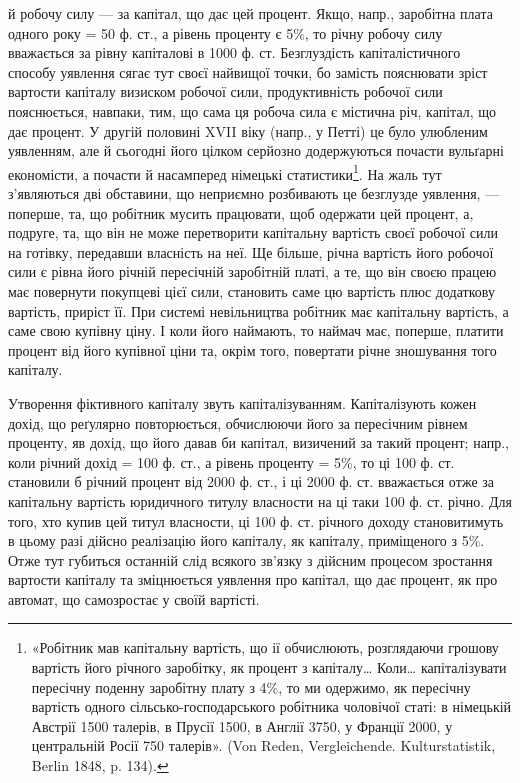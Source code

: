 \parcont{}  %
й робочу силу — за капітал, що дає цей процент. Якщо, напр., заробітна плата
одного року = 50 ф. ст., а рівень проценту є 5\%, то річну робочу силу вважається
за рівну капіталові в 1000 ф. ст. Безглуздість капіталістичного способу
уявлення сягає тут своєї найвищої точки, бо замість пояснювати зріст вартости
капіталу визиском робочої сили, продуктивність робочої сили пояснюється, навпаки,
тим, що сама ця робоча сила є містична річ, капітал, що дає процент.
У другій половині XVII віку (напр., у Петті) це було улюбленим уявленням,
але й сьогодні його цілком серйозно додержуються почасти вульґарні економісти,
а почасти й насамперед німецькі статистики\footnote{
«Робітник мав капітальну вартість, що ії обчислюють, розглядаючи грошову вартість його
річного заробітку, як процент з капіталу\dots{} Коли\dots{} капіталізувати пересічну поденну заробітну
плату з 4\%, то ми одержимо, як пересічну вартість одного сільсько-господарського робітника чоловічої
статі: в німецькій Австрії 1500 талерів, в Прусії 1500, в Англії 3750, у Франції 2000, у
центральній Росії 750 талерів». (Von Reden, Vergleichende. Kulturstatistik, Berlin 1848, p. 134).
}. На жаль тут з’являються дві
обставини, що неприємно розбивають це безглузде уявлення, — поперше, та, що
робітник мусить працювати, щоб одержати цей процент, а, подруге, та, що він
не може перетворити капітальну вартість своєї робочої сили на готівку, передавши
власність на неї. Ще більше, річна вартість його робочої сили є рівна
його річній пересічній заробітній платі, а те, що він своєю працею має повернути
покупцеві цієї сили, становить саме цю вартість плюс додаткову вартість,
приріст її. При системі невільництва робітник має капітальну вартість, а саме
свою купівну ціну. І коли його наймають, то наймач має, поперше, платити
процент від його купівної ціни та, окрім того, повертати річне зношування
того капіталу.

Утворення фіктивного капіталу звуть капіталізуванням. Капіталізують кожен
дохід, що реґулярно повторюється, обчислюючи його за пересічним рівнем проценту,
яв дохід, що його давав би капітал, визичений за такий процент; напр.,
коли річний дохід = 100 ф. ст., а рівень проценту = 5\%, то ці 100 ф. ст.
становили б річний процент від 2000 ф. ст., і ці 2000 ф. ст. вважається отже
за капітальну вартість юридичного титулу власности на ці таки 100 ф. ст.
річно. Для того, хто купив цей титул власности, ці 100 ф. ст. річного доходу
становитимуть в цьому разі дійсно реалізацію його капіталу, як капіталу, приміщеного
з 5\%. Отже тут губиться останній слід всякого зв’язку з дійсним
процесом зростання вартости капіталу та зміцнюється уявлення про капітал, що
дає процент, як про автомат, що самозростає у своїй вартісті.


